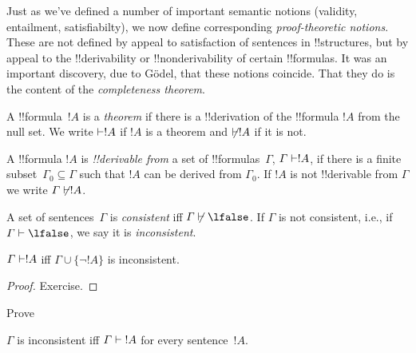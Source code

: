 \documentclass[../../include/open-logic-section]{subfiles}
\begin{document}

\begin{explain}
Just as we've defined a number of important semantic notions
(validity, entailment, satisfiabilty), we now define corresponding
\emph{proof-theoretic notions}.  These are not defined by appeal to
satisfaction of sentences in !!{structure}s, but by appeal to the
!!{derivability} or !!{nonderivability} of certain !!{formula}s.  It was
an important discovery, due to G\"odel, that these notions coincide.
That they do is the content of the \emph{completeness theorem}.
\end{explain}

\begin{defn}[Theorems]
A !!{formula}~$!A$ is a \emph{theorem} if there is a !!{derivation}
 of the !!{formula} $!A$ from the null set.  We write
$\Proves !A$ if $!A$ is a theorem and $\Proves/
!A$ if it is not.
\end{defn}

\begin{defn}[!!^{derivability}]
A !!{formula} $!A$ is \emph{!!{derivable} from} a set of
!!{formula}s~$\Gamma$, $\Gamma \Proves !A$, if there is a
finite subset~$\Gamma_0 \subseteq \Gamma$ such that
$!A$ can be derived from $\Gamma_0$.  If $!A$ is not !!{derivable} 
from $\Gamma$ we write $\Gamma \Proves/ !A$.
\end{defn}

\begin{defn}[Consistency]
A set of sentences~$\Gamma$ is \emph{consistent} iff $\Gamma
\Proves/ \lfalse$.  If $\Gamma$ is not consistent, i.e., if
$\Gamma \Proves \lfalse$, we say it is \emph{inconsistent}.
\end{defn}

\begin{prop}
$\Gamma \Proves !A$ iff $\Gamma \cup \{\lnot !A\}$ is inconsistent.
\end{prop}

\begin{proof}
Exercise.
\end{proof}

\begin{prob}
Prove 
\end{prob}

\begin{prop}
$\Gamma$ is inconsistent iff $\Gamma \Proves {!A}$ for every
  sentence~$!A$.
\end{prop}
\end{document}

